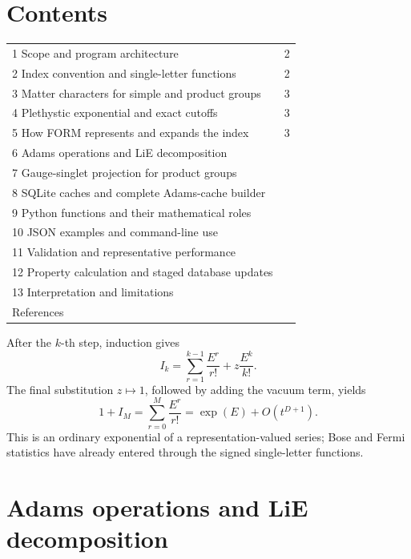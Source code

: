 \documentclass[11pt,a4paper]{article}
\begin{document}
\section*{Contents}
\begin{tabularx}{\textwidth}{@{}Yr@{}}
1 Scope and program architecture & 2\\
2 Index convention and single-letter functions & 2\\
3 Matter characters for simple and product groups & 3\\
4 Plethystic exponential and exact cutoffs & 3\\
5 How FORM represents and expands the index & 3\\
6 Adams operations and LiE decomposition & \pageref{sec:adams}\\
7 Gauge-singlet projection for product groups & \pageref{sec:projection}\\
8 SQLite caches and complete Adams-cache builder & \pageref{sec:cache}\\
9 Python functions and their mathematical roles & \pageref{sec:functions}\\
10 JSON examples and command-line use & \pageref{sec:json}\\
11 Validation and representative performance & \pageref{sec:validation}\\
12 Property calculation and staged database updates & \pageref{sec:propertydb}\\
13 Interpretation and limitations & \pageref{sec:limits}\\
References & \pageref{sec:refs}\\
\end{tabularx}
\clearpage

\setcounter{section}{5}\setcounter{subsection}{3}\setcounter{equation}{18}
After the $k$-th step, induction gives
\begin{equation}
 I_k=\sum_{r=1}^{k-1}\frac{E^r}{r!}+z\frac{E^k}{k!}.
\end{equation}
The final substitution $z\mapsto1$, followed by adding the vacuum term, yields
\begin{equation}
 1+I_M=\sum_{r=0}^{M}\frac{E^r}{r!}=\exp(E)+O(t^{D+1}).
\end{equation}
This is an ordinary exponential of a representation-valued series; Bose and Fermi
statistics have already entered through the signed single-letter functions.

\section{Adams operations and LiE decomposition}\label{sec:adams}
\end{document}
